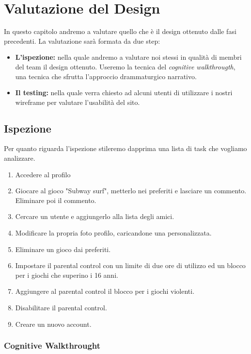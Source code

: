 \documentclass[../Report.tex]{subfiles}
\begin{document}
    \chapter{Valutazione del Design}
    In questo capitolo andremo a valutare quello che è il design ottenuto dalle fasi precedenti. La valutazione sarà formata da due step:
    \begin{itemize}
        \item \textbf{L'ispezione:} nella quale andremo a valutare noi stessi in qualità di membri del team il design ottenuto. Useremo la tecnica del \emph{cognitive walkthrougth}, una tecnica che sfrutta l'approccio drammaturgico narrativo.
        \item  \textbf{Il testing:} nella quale verra chiesto ad alcuni utenti di utilizzare i nostri wireframe per valutare l'usabilità del sito. 
    \end{itemize}

    \section{Ispezione}
    Per quanto riguarda l'ispezione stileremo dapprima una lista di task che vogliamo analizzare.
    \begin{enumerate}
        \item Accedere al profilo
        \item Giocare al gioco "Subway surf", metterlo nei preferiti e lasciare un commento. Eliminare poi il commento.
        \item Cercare un utente e aggiungerlo alla lista degli amici.
        \item Modificare la propria foto profilo, caricandone una personalizzata.
        \item Eliminare un gioco dai preferiti.
        \item Impostare il parental control con un limite di due ore di utilizzo ed un blocco per i giochi che superino i 16 anni.
        \item Aggiungere al parental control il blocco per i giochi violenti.
        \item Disabilitare il parental control.
        \item Creare un nuovo account.
    \end{enumerate}
    \subsection{Cognitive Walkthrought}
\end{document}
